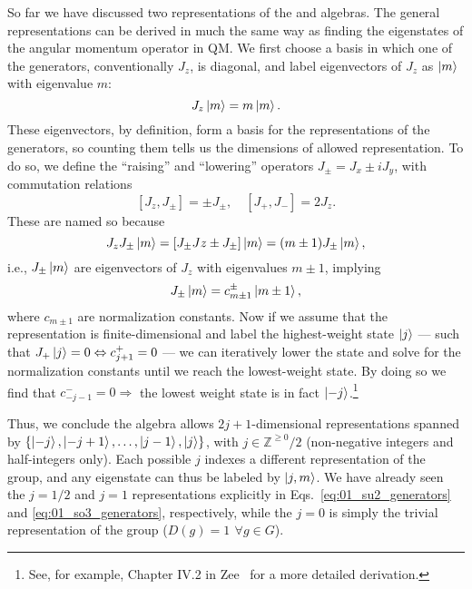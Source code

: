 So far we have discussed two representations of the \so[3] and \su[2] algebras.
The general representations can be derived in much the same way as finding the eigenstates of the angular momentum operator in QM.
We first choose a basis in which one of the generators, conventionally $J_z$, is diagonal, and label eigenvectors of $J_z$ as $\ket{m}$ with eigenvalue $m$:
\begin{equation}
	\label{eq:01_so3_su2_eigenstates}
	J_z\ket{m} = m\ket{m}.
\end{equation}
These eigenvectors, by definition, form a basis for the representations of the generators, so counting them tells us the dimensions of allowed representation.
To do so, we define the ``raising'' and ``lowering'' operators $J_{\pm} = J_x \pm i J_y$, with commutation relations
\begin{equation}
	\label{eq:01_so3_su2_raise_lower}
	[J_z, J_{\pm}] = \pm J_{\pm}, \quad [J_+, J_-] = 2J_z.
\end{equation}
These are named so because
\begin{equation}
	\label{eq:01_so3_su2_raise_lower_eigenstates}
	J_zJ_\pm\ket{m} = [J_\pm Jz \pm J_\pm]\ket{m} = (m \pm 1)J_\pm\ket{m},
\end{equation}
i.e., $J_\pm\ket{m}$ are eigenvectors of $J_z$ with eigenvalues $m \pm 1$, implying
\begin{equation}
	\label{eq:01_so3_su2_raise_lower_operation}
	J_\pm\ket{m} = c^\pm_{m\pm1}\ket{m \pm 1},
\end{equation}
where $c_{m\pm1}$ are normalization constants.
Now if we assume that the representation is finite-dimensional and label the highest-weight state $\ket{j}$ --- such that $J_+\ket{j} = 0 \Leftrightarrow c^+_{j+1} = 0$ --- we can iteratively lower the state and solve for the normalization constants until we reach the lowest-weight state.
By doing so we find that $c^-_{-j-1} = 0 \Rightarrow$ the lowest weight state is in fact $\ket{-j}$.\footnote{See, for example, Chapter IV.2 in Zee~\cite{Zee:2016fuk} for a more detailed derivation.}

Thus, we conclude the algebra allows $2j+1$-dimensional representations spanned by $\{\ket{-j}, \ket{-j+1}, \ldots, \ket{j-1}, \ket{j}\}$, with $j \in \mathbb Z^{\geq0}/2$ (non-negative integers and half-integers only).
Each possible $j$ indexes a different representation of the group, and any eigenstate can thus be labeled by $\ket{j, m}$.
We have already seen the $j = 1/2$ and $j = 1$ representations explicitly in Eqs.~\ref{eq:01_su2_generators} and \ref{eq:01_so3_generators}, respectively, while the $j = 0$ is simply the trivial representation of the group ($D(g) = 1 \,\ \forall g \in G$).

